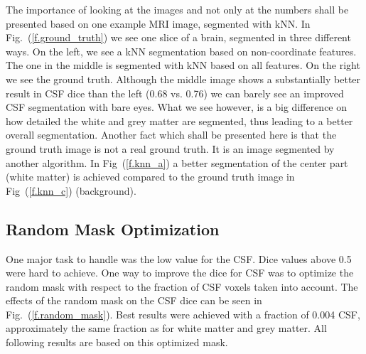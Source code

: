 \documentclass[journal]{IEEEtran}
\begin{document}
The importance of looking at the images and not only at the numbers shall be presented based on one example MRI image, segmented with kNN. In Fig.~(\ref{f.ground_truth}) we see one slice of a brain, segmented in three different ways. On the left, we see a kNN segmentation based on non-coordinate features. The one in the middle is segmented with kNN based on all features. On the right we see the ground truth. Although the middle image shows a substantially better result in CSF dice than the left (0.68 vs. 0.76) we can barely see an improved CSF segmentation with bare eyes. What we see however, is a big difference on how detailed the white and grey matter are segmented, thus leading to a better overall segmentation. Another fact which shall be presented here is that the ground truth image is not a real ground truth. It is an image segmented by another algorithm. In Fig~(\ref{f.knn_a}) a better segmentation of the center part (white matter) is achieved compared to the ground truth image in Fig~(\ref{f.knn_c}) (background).




\subsection{Random Mask Optimization}

One major task to handle was the low value for the CSF. Dice values above 0.5 were hard to achieve. One way to improve the dice for CSF was to optimize the random mask with respect to the fraction of CSF voxels taken into account. The effects of the random mask on the CSF dice can be seen in Fig.~(\ref{f.random_mask}). Best results were achieved with a fraction of 0.004 CSF, approximately the same fraction as for white matter and grey matter. All following results are based on this optimized mask.
\end{document}
